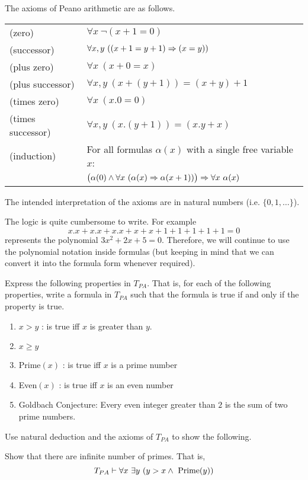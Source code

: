 The axioms of Peano arithmetic are as follows.
\begin{table}[H]
\begin{tabular}{l l}
(zero) & $\forall x ~\neg (x+1=0)$ \\
(successor) & $\forall x,y ~((x+1=y+1) \Rightarrow (x=y))$ \\
(plus zero) &  $\forall x ~(x+0 = x)$ \\
(plus successor) & $\forall x,y ~(x+(y+1)) = (x+y)+1$ \\
(times zero) & $\forall x ~(x.0 = 0)$ \\
 (times successor) & $\forall x,y ~(x.(y+1)) = (x.y+x)$ \\
(induction) & For all formulas $\alpha(x)$ with a single free variable $x$: \\
 & $
\big( \alpha(0) \wedge \forall x ~(\alpha(x) \Rightarrow \alpha(x+1)) \big) \Rightarrow \forall x ~ \alpha(x)
$
\end{tabular}
\end{table}

The intended interpretation of the axioms are in natural numbers (i.e. $\{0,1,\dots\}$).

The logic is quite cumbersome to write. For example
\[
x.x + x.x + x.x + x + x + 1 + 1 + 1 + 1 + 1 = 0
\]
represents the polynomial $3x^2 + 2x+5 = 0$. Therefore, we will continue to use the polynomial notation inside formulas (but keeping in mind that we can convert it into the formula form whenever required).

\begin{exercise}
Express the following properties in $T_{PA}$. That is, for each of the following properties, write a formula in $T_{PA}$ such that the formula is true if and only if the property is true.
\begin{enumerate}
\item $x>y$ : is true iff $x$ is greater than $y$.
\item $x \geq y$
\item Prime$(x)$ : is true iff $x$ is a prime number
\item Even$(x)$ : is true iff $x$ is an even number
\item Goldbach Conjecture: Every even integer greater than $2$ is the sum of two prime numbers.
\end{enumerate}
\end{exercise}

Use natural deduction and the axioms of $T_{PA}$ to show the following.
\begin{exercise}
Show that there are infinite number of primes. That is, 
\[
T_{PA} \vdash \forall x ~\exists y ~(y > x \wedge \text{ Prime}(y)) 
\]
\end{exercise}

